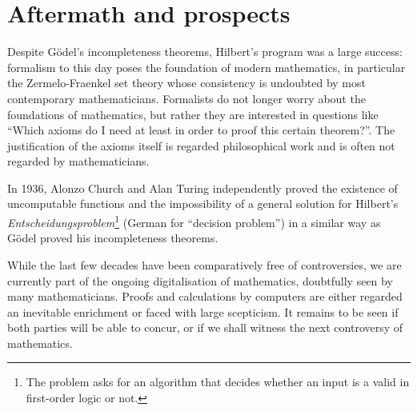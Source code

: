 \documentclass[hidelinks]{article}
\begin{document}
\section{Aftermath and prospects}
Despite Gödel's incompleteness theorems, Hilbert's program was a large success: formalism to this day poses the foundation of modern mathematics, in particular the Zermelo-Fraenkel set theory whose consistency is undoubted by most contemporary mathematicians.  
Formalists do not longer worry about the foundations of mathematics, but rather they are interested in questions like ``Which axioms do I need at least in order to proof this certain theorem?''. The justification of the axioms itself is regarded philosophical work and is often not regarded by mathematicians.

In 1936, Alonzo Church and Alan Turing independently proved the existence of uncomputable functions and the impossibility of a general solution for Hilbert's \textit{Entscheidungspro\-blem}\footnote{The problem asks for an algorithm that decides whether an input is a valid in first-order logic or not.} (German for ``decision problem'') in a similar way as Gödel proved his incompleteness theorems.

While the last few decades have been comparatively free of controversies, we are currently part of the ongoing digitalisation of mathematics, doubtfully seen by many mathematicians. Proofs and calculations by computers are either regarded an inevitable enrichment or faced with large scepticism. It remains to be seen if both parties will be able to concur, or if we shall witness the next controversy of mathematics.

\newpage


\end{document}

